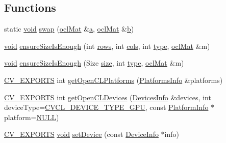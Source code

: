 \subsection*{Functions}
\begin{DoxyCompactItemize}
\item 
static \hyperlink{legacy_8hpp_a8bb47f092d473522721002c86c13b94e}{void} \hyperlink{namespacecv_1_1ocl_aa564c0f9ca4ed4a11e7e9fa32abdbdad}{swap} (\hyperlink{classcv_1_1ocl_1_1oclMat}{ocl\-Mat} \&\hyperlink{legacy_8hpp_a1031d0e0a97a340abfe0a6ab9e831045}{a}, \hyperlink{classcv_1_1ocl_1_1oclMat}{ocl\-Mat} \&\hyperlink{legacy_8hpp_ac04272e8ca865b8fba18d36edae9fd2a}{b})
\item 
\hyperlink{legacy_8hpp_a8bb47f092d473522721002c86c13b94e}{void} \hyperlink{namespacecv_1_1ocl_ac47692f18c81f5f4e0b2ce15e98fac8e}{ensure\-Size\-Is\-Enough} (int \hyperlink{imgproc__c_8h_a061459acc9e078fa4699e0e349887215}{rows}, int \hyperlink{core__c_8h_a4407a60bc4387adae24cee658711f2d9}{cols}, int \hyperlink{imgproc__c_8h_a84612d8738bf935200cf32a103d8efe1}{type}, \hyperlink{classcv_1_1ocl_1_1oclMat}{ocl\-Mat} \&m)
\item 
\hyperlink{legacy_8hpp_a8bb47f092d473522721002c86c13b94e}{void} \hyperlink{namespacecv_1_1ocl_a3512feff2362fefd50232ae0e749b21b}{ensure\-Size\-Is\-Enough} (Size \hyperlink{legacy_8hpp_ae97003f8d5c64cdfb99f6f2606d121b6}{size}, int \hyperlink{imgproc__c_8h_a84612d8738bf935200cf32a103d8efe1}{type}, \hyperlink{classcv_1_1ocl_1_1oclMat}{ocl\-Mat} \&m)
\item 
\hyperlink{core_2types__c_8h_a1bf9f0e121b54272da02379cfccd0a2b}{C\-V\-\_\-\-E\-X\-P\-O\-R\-T\-S} int \hyperlink{namespacecv_1_1ocl_ad3a47cbafcaa94b21505101571e6c1ef}{get\-Open\-C\-L\-Platforms} (\hyperlink{namespacecv_1_1ocl_a023858a053cfb1cbf0545e54dcc8c798}{Platforms\-Info} \&platforms)
\item 
\hyperlink{core_2types__c_8h_a1bf9f0e121b54272da02379cfccd0a2b}{C\-V\-\_\-\-E\-X\-P\-O\-R\-T\-S} int \hyperlink{namespacecv_1_1ocl_a89fbf3df584389aa3aa2f46a5ccce3d6}{get\-Open\-C\-L\-Devices} (\hyperlink{namespacecv_1_1ocl_a0ce4074167f6aee3ebee6861ad51cffd}{Devices\-Info} \&devices, int device\-Type=\hyperlink{namespacecv_1_1ocl_ab965d48273d9ddc69bcb0fbd2d7de77ea889ff1d8474cb5a5239958bf70d901bc}{C\-V\-C\-L\-\_\-\-D\-E\-V\-I\-C\-E\-\_\-\-T\-Y\-P\-E\-\_\-\-G\-P\-U}, const \hyperlink{structcv_1_1ocl_1_1PlatformInfo}{Platform\-Info} $\ast$platform=\hyperlink{Config_8cpp_a070d2ce7b6bb7e5c05602aa8c308d0c4}{N\-U\-L\-L})
\item 
\hyperlink{core_2types__c_8h_a1bf9f0e121b54272da02379cfccd0a2b}{C\-V\-\_\-\-E\-X\-P\-O\-R\-T\-S} \hyperlink{legacy_8hpp_a8bb47f092d473522721002c86c13b94e}{void} \hyperlink{namespacecv_1_1ocl_ace26d91db2b36f8eb4f5e8430b7cedd0}{set\-Device} (const \hyperlink{structcv_1_1ocl_1_1DeviceInfo}{Device\-Info} $\ast$info)

\end{DoxyCompactItemize}
